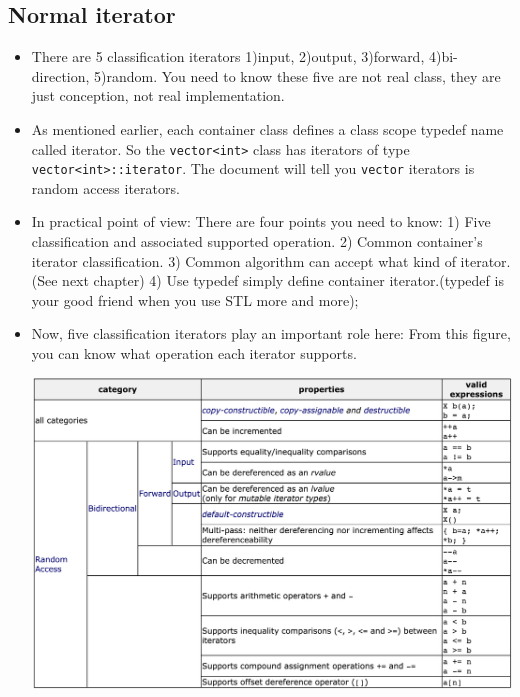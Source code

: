 \documentclass[a4paper,11pt,twoside]{book}
\begin{document}
\subsection{Normal iterator}
\begin{itemize}
	\item There are 5 classification iterators 1)input, 2)output, 3)forward, 4)bi-direction, 5)random.
You need to know these five are not real class, they are just conception, not real implementation.

	\item As mentioned earlier, each container class defines a class scope typedef name called iterator. So the \texttt{vector<int>} class has iterators of type \texttt{vector<int>::iterator}.  The document will tell you \texttt{vector} iterators is random access iterators.

	\item In practical point of view: There are four points you need to know:
1) Five classification and associated supported operation.
2) Common container's iterator classification.
3) Common algorithm can accept what kind of iterator. (See next chapter)
4) Use typedef simply define container iterator.(typedef is your good friend when you use STL more and more);


	\item Now, five classification iterators play an important role here: From this figure, you can know what operation each iterator supports.  \newline
\begin{center}
	  \includegraphics[scale=0.48]{pics/iterator.png}
\end{center}



\end{itemize}
\end{document}
